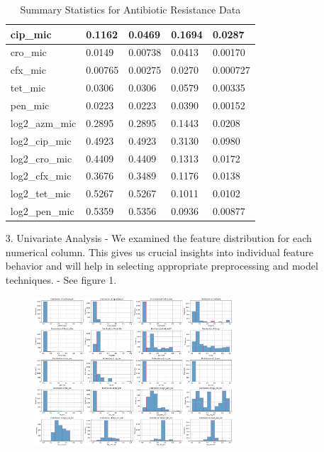 \documentclass[manuscript,screen,review, nonacm]{acmart}
\begin{document}
\begin{itemize}
\begin{table}[H]
\begin{tabular}{|l|l|l|l|l|}
        cip\_mic              & 0.1162           & 0.0469           & 0.1694           & 0.0287            \\ \hline
        cro\_mic              & 0.0149           & 0.00738          & 0.0413           & 0.00170           \\ \hline
        cfx\_mic              & 0.00765          & 0.00275          & 0.0270           & 0.000727          \\ \hline
        tet\_mic              & 0.0306           & 0.0306           & 0.0579           & 0.00335           \\ \hline
        pen\_mic              & 0.0223           & 0.0223           & 0.0390           & 0.00152           \\ \hline
        log2\_azm\_mic        & 0.2895           & 0.2895           & 0.1443           & 0.0208            \\ \hline
        log2\_cip\_mic        & 0.4923           & 0.4923           & 0.3130           & 0.0980            \\ \hline
        log2\_cro\_mic        & 0.4409           & 0.4409           & 0.1313           & 0.0172            \\ \hline
        log2\_cfx\_mic        & 0.3676           & 0.3489           & 0.1176           & 0.0138            \\ \hline
        log2\_tet\_mic        & 0.5267           & 0.5267           & 0.1011           & 0.0102            \\ \hline
        log2\_pen\_mic        & 0.5359           & 0.5356           & 0.0936           & 0.00877           \\ \hline
        \end{tabular}
        \caption{Summary Statistics for Antibiotic Resistance Data}
    \end{table}
    \item[3.] Univariate Analysis - We examined the feature distribution for each numerical column. This gives us crucial insights into individual feature behavior 
    and will help in selecting appropriate preprocessing and model techniques. - See figure 1.
            \begin{figure}[H]
                \centering
                \vspace{-10pt}
                \includegraphics[width=0.7\textwidth]{figures/univar.png}

\end{figure}
\end{itemize}
\end{document}
